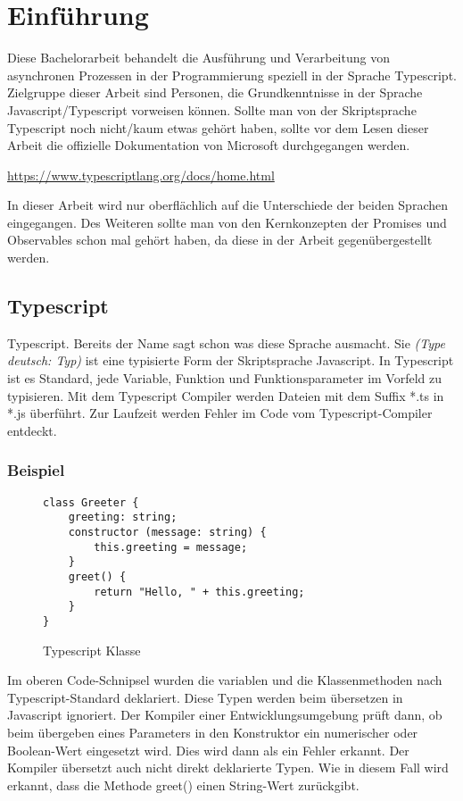 \setcounter{secnumdepth}{1}
\section{Einführung}
Diese Bachelorarbeit behandelt die Ausführung und Verarbeitung von asynchronen Prozessen in der Programmierung speziell in der Sprache Typescript.\\
Zielgruppe dieser Arbeit sind Personen, die Grundkenntnisse in der Sprache Javascript/Typescript vorweisen können.
Sollte man von der Skriptsprache Typescript noch nicht/kaum etwas gehört haben, sollte vor dem Lesen dieser Arbeit die offizielle Dokumentation von Microsoft durchgegangen werden.

\begin{center}
\url{https://www.typescriptlang.org/docs/home.html} 
\end{center}

In dieser Arbeit wird nur oberflächlich auf die Unterschiede der beiden Sprachen eingegangen. Des Weiteren sollte man von den Kernkonzepten der Promises und Observables schon mal gehört haben, da diese in der Arbeit gegenübergestellt werden.

\subsection{Typescript}
Typescript. Bereits der Name sagt schon was diese Sprache ausmacht. Sie \textit{(\glqq{}Type\grqq{} deutsch: Typ)} ist eine typisierte Form der Skriptsprache Javascript. In Typescript ist es Standard, jede Variable, Funktion und Funktionsparameter im Vorfeld zu typisieren. Mit dem Typescript Compiler werden Dateien mit dem Suffix *.ts in *.js überführt. Zur Laufzeit werden Fehler im Code vom Typescript-Compiler entdeckt.

\subsubsection{Beispiel}

\begin{figure}[h!]
\begin{lstlisting}
class Greeter {
    greeting: string;
    constructor (message: string) {
        this.greeting = message;
    }
    greet() {
        return "Hello, " + this.greeting;
    }
}  
\end{lstlisting}
\caption{Typescript Klasse \cite{typescript-example}}
\end{figure}

Im oberen Code-Schnipsel wurden die variablen und die Klassenmethoden nach Typescript-Standard deklariert. Diese Typen werden beim übersetzen in Javascript ignoriert. Der Kompiler einer Entwicklungsumgebung prüft dann, ob beim übergeben eines Parameters in den Konstruktor ein numerischer oder Boolean-Wert eingesetzt wird. Dies wird dann als ein Fehler erkannt. Der Kompiler übersetzt auch nicht direkt deklarierte Typen. Wie in diesem Fall wird erkannt, dass die Methode greet() einen String-Wert zurückgibt.

